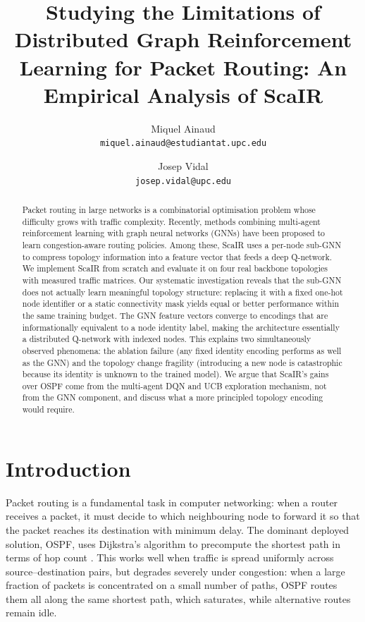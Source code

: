 \documentclass[10pt,twocolumn,letterpaper]{article}
\begin{document}
\title{Studying the Limitations of Distributed Graph Reinforcement\\
Learning for Packet Routing: An Empirical Analysis of ScaIR}

\author{Miquel Ainaud\\
{\tt\small miquel.ainaud@estudiantat.upc.edu}
\and
Josep Vidal\\
{\tt\small josep.vidal@upc.edu}
}

\maketitle

\begin{abstract}
Packet routing in large networks is a combinatorial optimisation problem
whose difficulty grows with traffic complexity. Recently, methods combining
multi-agent reinforcement learning with graph neural networks (GNNs) have
been proposed to learn congestion-aware routing policies. Among these,
ScaIR uses a per-node sub-GNN to compress topology information into a
feature vector that feeds a deep Q-network. We implement ScaIR from
scratch and evaluate it on four real backbone topologies with measured
traffic matrices. Our systematic investigation reveals that the sub-GNN
does not actually learn meaningful topology structure: replacing it with
a fixed one-hot node identifier or a static connectivity mask yields
equal or better performance within the same training budget. The GNN
feature vectors converge to encodings that are informationally
equivalent to a node identity label, making the architecture essentially
a distributed Q-network with indexed nodes. This explains two
simultaneously observed phenomena: the ablation failure
(any fixed identity encoding performs as well as the GNN) and the
topology change fragility (introducing a new node is catastrophic because
its identity is unknown to the trained model). We argue that ScaIR's
gains over OSPF come from the multi-agent DQN and UCB exploration
mechanism, not from the GNN component, and discuss what a more
principled topology encoding would require.
\end{abstract}

\section{Introduction}

Packet routing is a fundamental task in computer networking: when a router
receives a packet, it must decide to which neighbouring node to forward it
so that the packet reaches its destination with minimum delay. The dominant
deployed solution, OSPF, uses Dijkstra's algorithm to precompute the
shortest path in terms of hop count \cite{dijkstra1959}. This works well
when traffic is spread uniformly across source--destination pairs, but degrades severely under
congestion: when a large fraction of packets is concentrated on a small
number of paths, OSPF routes them all along the same shortest path,
which saturates, while alternative routes remain idle.
\end{document}
